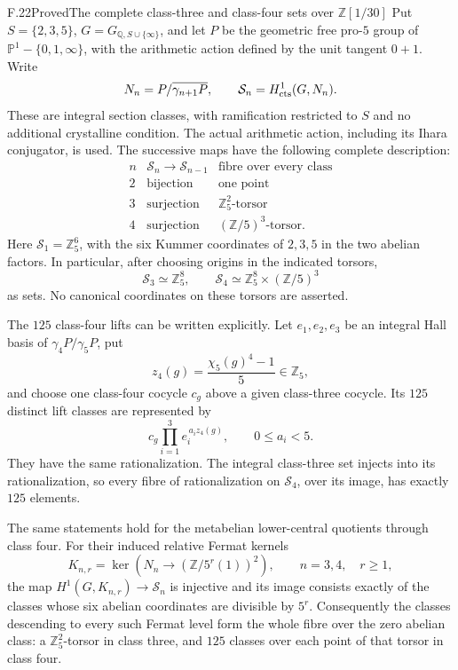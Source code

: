 \begin{statement}{F.22}{Proved}{The complete class-three and class-four sets over \(\mathbb Z[1/30]\)}
Put \(S=\{2,3,5\}\), \(G=G_{\mathbb Q,S\cup\{\infty\}}\), and let
\(P\) be the geometric free pro-\(5\) group of
\(\mathbb P^1-\{0,1,\infty\}\), with the arithmetic action defined
by the unit tangent \(0+\!1\). Write
\[
 N_n=P/\overline{\gamma_{n+1}P},\qquad
                 \mathcal S_n=H^1_{\rm cts}(G,N_n).
\]
These are integral section classes, with ramification restricted
to \(S\) and no additional crystalline condition. The actual
arithmetic action, including its Ihara conjugator, is used.
The successive maps have the following complete description:
\[
\begin{array}{c|c|c}
 n&\mathcal S_n\longrightarrow\mathcal S_{n-1}
       &\text{fibre over every class}\\ \hline
 2&\text{bijection}&\text{one point}\\
 3&\text{surjection}&\mathbb Z_5^2\text{-torsor}\\
 4&\text{surjection}&(\mathbb Z/5)^3\text{-torsor}.
\end{array}                                                   \tag{F.22.1}
\]
Here \(\mathcal S_1=\mathbb Z_5^6\), with the six Kummer
coordinates of \(2,3,5\) in the two abelian factors. In
particular, after choosing origins in the indicated torsors,
\[
 \mathcal S_3\simeq\mathbb Z_5^8,\qquad
 \mathcal S_4\simeq\mathbb Z_5^8\times(\mathbb Z/5)^3
                                                               \tag{F.22.2}
\]
as sets. No canonical coordinates on these torsors are asserted.

The \(125\) class-four lifts can be written explicitly.
Let \(e_1,e_2,e_3\) be an integral Hall basis of
\(\gamma_4P/\gamma_5P\), put
\[
       z_4(g)=\frac{\chi_5(g)^4-1}{5}\in\mathbb Z_5,
                                                               \tag{F.22.3}
\]
and choose one class-four cocycle \(c_g\) above a given
class-three cocycle. Its \(125\) distinct lift classes are
represented by
\[
             c_g\prod_{i=1}^3 e_i^{\,a_i z_4(g)},
                    \qquad 0\leq a_i<5.                       \tag{F.22.4}
\]
They have the same rationalization. The integral class-three
set injects into its rationalization, so every fibre of
rationalization on \(\mathcal S_4\), over its image, has
exactly \(125\) elements.

The same statements hold for the metabelian lower-central
quotients through class four. For their induced relative
Fermat kernels
\[
 K_{n,r}=\ker\!\left(N_n\longrightarrow
                          (\mathbb Z/5^r(1))^2\right),
                  \qquad n=3,4,\quad r\geq1,
\]
the map \(H^1(G,K_{n,r})\to\mathcal S_n\) is injective and its
image consists exactly of the classes whose six abelian
coordinates are divisible by \(5^r\). Consequently the classes
descending to every such Fermat level form the whole fibre
over the zero abelian class: a \(\mathbb Z_5^2\)-torsor in class
three, and \(125\) classes over each point of that torsor in
class four.


\end{statement}
